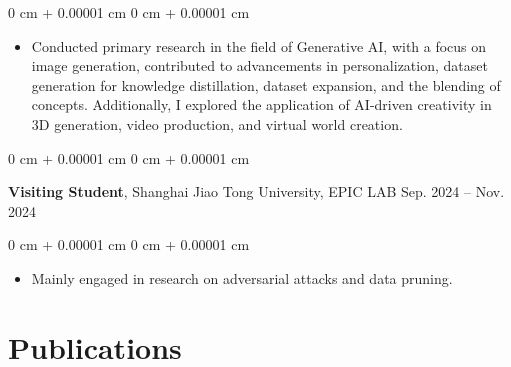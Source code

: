 \documentclass[10pt, letterpaper]{article}
\newenvironment{highlights}{
    \begin{itemize}[
        topsep=0.10 cm,
        parsep=0.10 cm,
        partopsep=0pt,
        itemsep=0pt,
        leftmargin=0 cm + 10pt
    ]
}{
    \end{itemize}
} %
\newenvironment{onecolentry}{
    \begin{adjustwidth}{
        0 cm + 0.00001 cm
    }{
        0 cm + 0.00001 cm
    }
}{
    \end{adjustwidth}
} %
\newenvironment{twocolentry}[2][]{
    \onecolentry
    \def\secondColumn{#2}
    \setcolumnwidth{\fill, 4.5 cm}
    \begin{paracol}{2}
}{
    \switchcolumn \raggedleft \secondColumn
    \end{paracol}
    \endonecolentry
} %
\begin{document}
        \vspace{0.10 cm}
        \begin{onecolentry}
            \begin{highlights}
                \item Conducted primary research in the field of Generative AI, with a focus on image generation, contributed to advancements in personalization, dataset generation for knowledge distillation, dataset expansion, and the blending of concepts. Additionally, I explored the application of AI-driven creativity in 3D generation, video production, and virtual world creation.
            \end{highlights}
        \end{onecolentry}

        \vspace{0.2 cm}

        \begin{twocolentry}{
            Sep. 2024 – Nov. 2024
        }
            \textbf{Visiting Student}, Shanghai Jiao Tong University, EPIC LAB\end{twocolentry}
        \vspace{0.10 cm}
        \begin{onecolentry}
            \begin{highlights}
                \item Mainly engaged in research on adversarial attacks and data pruning.
            \end{highlights}
        \end{onecolentry}

    \section{Publications}
        
\end{document}
